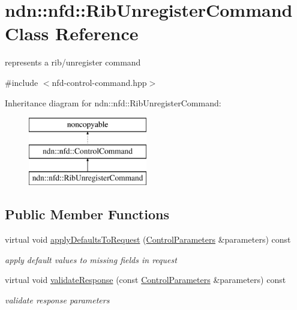 \hypertarget{classndn_1_1nfd_1_1RibUnregisterCommand}{}\section{ndn\+:\+:nfd\+:\+:Rib\+Unregister\+Command Class Reference}
\label{classndn_1_1nfd_1_1RibUnregisterCommand}


represents a rib/unregister command  




{\ttfamily \#include $<$nfd-\/control-\/command.\+hpp$>$}

Inheritance diagram for ndn\+:\+:nfd\+:\+:Rib\+Unregister\+Command\+:\begin{figure}[H]
\begin{center}
\leavevmode
\includegraphics[height=3.000000cm]{classndn_1_1nfd_1_1RibUnregisterCommand}
\end{center}
\end{figure}
\subsection*{Public Member Functions}
\begin{DoxyCompactItemize}
\item 
virtual void \hyperlink{classndn_1_1nfd_1_1RibUnregisterCommand_aa51c4c07f474fb51c34154c657d3bd0d}{apply\+Defaults\+To\+Request} (\hyperlink{classndn_1_1nfd_1_1ControlParameters}{Control\+Parameters} \&parameters) const\hypertarget{classndn_1_1nfd_1_1RibUnregisterCommand_aa51c4c07f474fb51c34154c657d3bd0d}{}\label{classndn_1_1nfd_1_1RibUnregisterCommand_aa51c4c07f474fb51c34154c657d3bd0d}

\begin{DoxyCompactList}\small\item\em apply default values to missing fields in request \end{DoxyCompactList}\item 
virtual void \hyperlink{classndn_1_1nfd_1_1RibUnregisterCommand_af709649c210d15654a34ef01b436cccb}{validate\+Response} (const \hyperlink{classndn_1_1nfd_1_1ControlParameters}{Control\+Parameters} \&parameters) const
\begin{DoxyCompactList}\small\item\em validate response parameters \end{DoxyCompactList}\end{DoxyCompactItemize}
